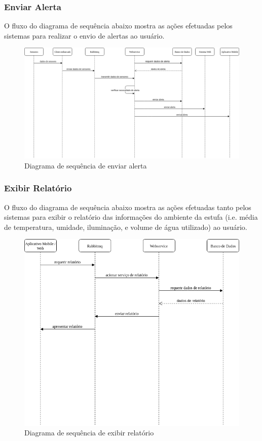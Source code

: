 \subsubsection{Enviar Alerta}

O fluxo do diagrama de sequência abaixo mostra as ações efetuadas pelos sistemas para realizar o envio de alertas ao usuário.

\begin{figure}[H]
	\centering
	\includegraphics[width=17cm]{figuras/enviar_alerta.png}
	\caption{Diagrama de sequência de enviar alerta} \label{enviar_alerta}
\end{figure}

\subsubsection{Exibir Relatório}

O fluxo do diagrama de sequência abaixo mostra as ações efetuadas tanto pelos sistemas para exibir o relatório das informações do ambiente da estufa (i.e. média de temperatura, umidade, iluminação, e volume de água utilizado) ao usuário.

\begin{figure}[H]
	\centering
	\includegraphics[width=18cm]{figuras/exibir_relatorio.png}
	\caption{Diagrama de sequência de exibir relatório} \label{exibir_relatorio}
\end{figure}

